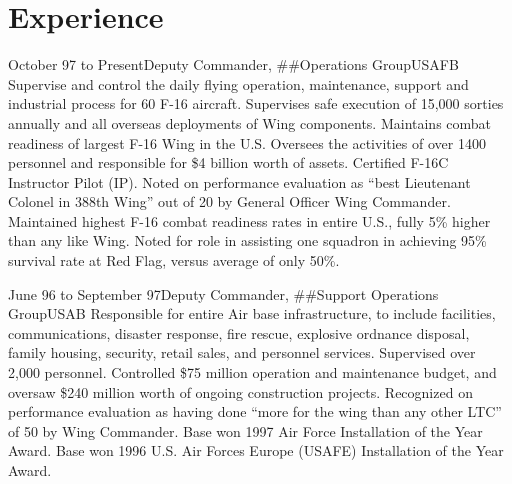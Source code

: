 \documentclass[9pt,letterpaper,times]{mtresume}
\begin{document}
\maketitle
\thispagestyle{empty} %

\section*{Experience}

\begin{job}{October 97 to Present}{Deputy Commander, \#\#Operations Group}{USAFB}{%
Supervise and control the daily flying operation,
maintenance, support and industrial process for 60 F-16 aircraft. Supervises safe execution of 15,000 sorties annually and all overseas
deployments of Wing components. Maintains combat readiness of largest F-16 Wing in the U.S. Oversees the activities of over 1400
personnel and responsible for \$4 billion worth of assets. Certified F-16C Instructor Pilot (IP).
}
\accomplishment Noted on performance evaluation as ``best Lieutenant Colonel in 388th Wing'' out of 20 by General Officer Wing Commander.
\accomplishment Maintained highest F-16 combat readiness rates in entire U.S., fully 5\% higher than any like Wing.
\accomplishment Noted for role in assisting one squadron in achieving 95\% survival rate at Red Flag, versus average of only 50\%.
\end{job}

\begin{job}{June 96 to September 97}{Deputy Commander, \#\#Support Operations Group}{USAB}{%
Responsible for entire Air base infrastructure, to include facilities, communications, disaster response, fire rescue, explosive ordnance disposal, family housing,
security, retail sales, and personnel services. Supervised over 2,000 personnel. Controlled \$75 million operation and maintenance
budget, and oversaw \$240 million worth of ongoing construction projects.
}
\accomplishment Recognized on performance evaluation as having done ``more for the wing than any other LTC'' of 50 by Wing Commander.
\accomplishment Base won 1997 Air Force Installation of the Year Award.
\accomplishment Base won 1996 U.S. Air Forces Europe (USAFE) Installation of the Year Award.
\end{job}
\end{document}
